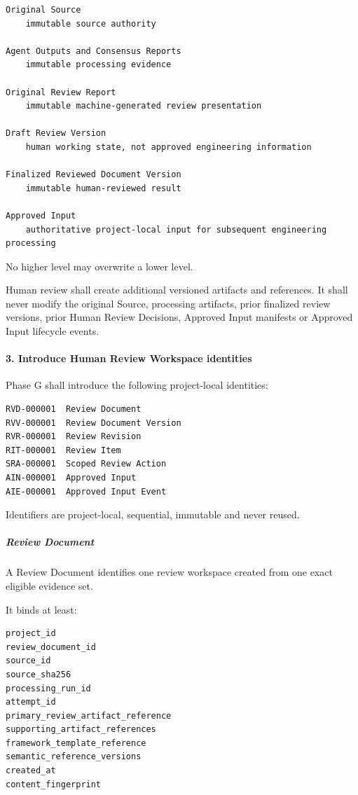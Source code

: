 \begin{verbatim}
Original Source
    immutable source authority

Agent Outputs and Consensus Reports
    immutable processing evidence

Original Review Report
    immutable machine-generated review presentation

Draft Review Version
    human working state, not approved engineering information

Finalized Reviewed Document Version
    immutable human-reviewed result

Approved Input
    authoritative project-local input for subsequent engineering processing
\end{verbatim}

No higher level may overwrite a lower level.

Human review shall create additional versioned artifacts and references. It shall never modify the original Source, processing artifacts, prior finalized review versions, prior Human Review Decisions, Approved Input manifests or Approved Input lifecycle events.

\hypertarget{3-introduce-human-review-workspace-identities}{%
\paragraph{3. Introduce Human Review Workspace identities}\label{3-introduce-human-review-workspace-identities}}

Phase G shall introduce the following project-local identities:

\begin{verbatim}
RVD-000001  Review Document
RVV-000001  Review Document Version
RVR-000001  Review Revision
RIT-000001  Review Item
SRA-000001  Scoped Review Action
AIN-000001  Approved Input
AIE-000001  Approved Input Event
\end{verbatim}

Identifiers are project-local, sequential, immutable and never reused.

\hypertarget{review-document}{%
\subparagraph{Review Document}\label{review-document}}

A Review Document identifies one review workspace created from one exact eligible evidence set.

It binds at least:

\begin{verbatim}
project_id
review_document_id
source_id
source_sha256
processing_run_id
attempt_id
primary_review_artifact_reference
supporting_artifact_references
framework_template_reference
semantic_reference_versions
created_at
content_fingerprint
\end{verbatim}

